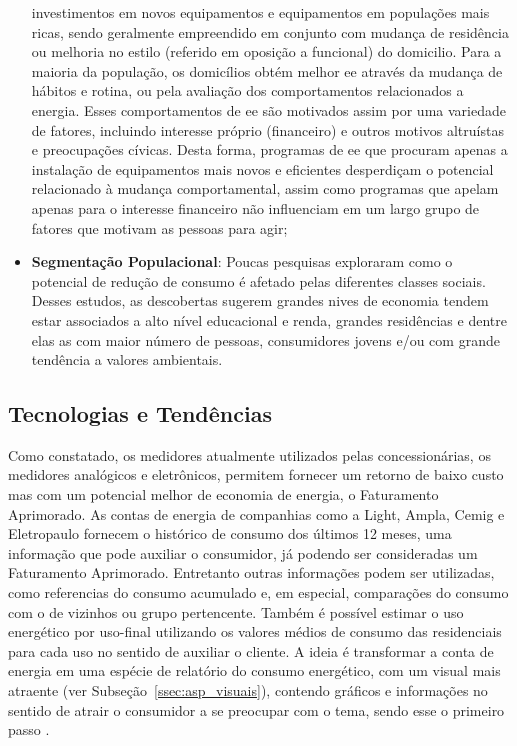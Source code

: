 \begin{itemize}
investimentos em novos equipamentos e equipamentos em populações mais ricas, sendo
geralmente empreendido em conjunto com mudança de residência ou melhoria no
estilo (referido em oposição a funcional) do domicilio. Para a maioria da
população, os domicílios obtém melhor \gls{ee} através da mudança de hábitos e
rotina, ou pela avaliação dos comportamentos relacionados a energia. Esses
comportamentos de \gls{ee} são motivados assim por uma variedade de fatores,
incluindo interesse próprio (financeiro) e outros motivos altruístas e
preocupações cívicas. Desta forma, programas de \gls{ee} que procuram apenas
a instalação de equipamentos mais novos e eficientes
desperdiçam o potencial relacionado à mudança comportamental, assim como
programas que apelam apenas para o interesse financeiro não influenciam em um
largo grupo de fatores que motivam as pessoas para agir;
\item \textbf{Segmentação Populacional}: Poucas pesquisas exploraram como o
potencial de redução de consumo é afetado pelas diferentes classes sociais.
Desses estudos, as descobertas sugerem grandes nives de economia tendem estar
associados a alto nível educacional e renda, grandes residências e dentre elas
as com maior número de pessoas, consumidores jovens e/ou com grande tendência a
valores ambientais.
\end{itemize}

\subsection{Tecnologias e Tendências}
\label{ssec:ret_tec}

Como constatado, os medidores atualmente utilizados pelas
concessionárias, os medidores analógicos e eletrônicos, permitem fornecer um
retorno de baixo custo mas com um potencial melhor de economia de energia,
o Faturamento Aprimorado. As contas de energia de companhias como a Light,
Ampla, Cemig e Eletropaulo fornecem o histórico de consumo dos últimos 12 meses,
uma informação que pode auxiliar o consumidor, já podendo ser consideradas um
Faturamento Aprimorado. Entretanto outras informações podem ser utilizadas,
como referencias do consumo acumulado e, em especial, comparações do consumo
com o de vizinhos ou grupo pertencente. Também é possível estimar o uso
energético por uso-final utilizando os valores médios de consumo das residenciais
para cada uso no sentido de auxiliar o cliente. A ideia é
transformar a conta de energia em uma espécie de relatório do consumo energético,
com um visual mais atraente (ver Subseção~\ref{ssec:asp_visuais}),
contendo gráficos e informações no sentido de atrair o consumidor a se
preocupar com o tema, sendo esse o primeiro passo \cite{2009_epri}.

